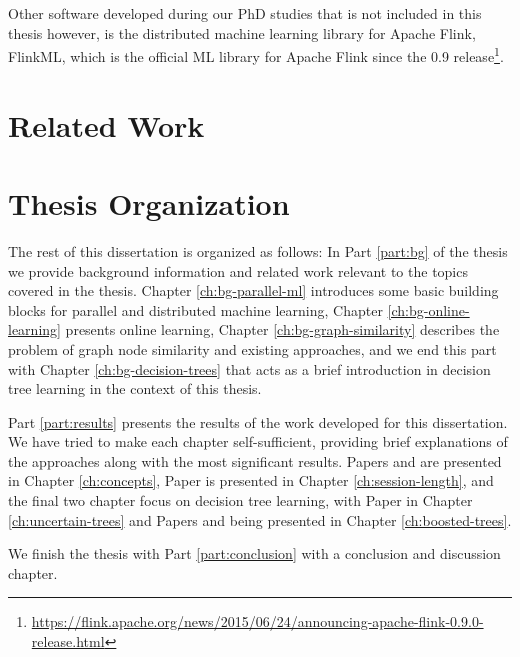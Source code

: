 Other software developed during our PhD studies that is not included in this
thesis however, is the distributed machine learning library for
Apache Flink, FlinkML, which is the official ML library for Apache Flink
since the 0.9 release\footnote{\url{https://flink.apache.org/news/2015/06/24/announcing-apache-flink-0.9.0-release.html}}.

\section{Related Work}

\section{Thesis Organization}

The rest of this dissertation is organized as follows:
In Part \ref{part:bg} of the thesis we provide background information and
related work relevant to the topics covered in the thesis. Chapter
\ref{ch:bg-parallel-ml} introduces some basic building blocks
for parallel and distributed machine learning, Chapter \ref{ch:bg-online-learning}
presents online learning, Chapter \ref{ch:bg-graph-similarity} describes the problem
of graph node similarity and existing approaches, and we end this part
with Chapter \ref{ch:bg-decision-trees} that acts as a brief introduction
in decision tree learning in the context of this thesis.

Part \ref{part:results} presents the results of the work developed for this
dissertation. We have tried to make each chapter self-sufficient, providing
brief explanations of the approaches along with the most significant results.
Papers \conceptsicdmNum and \conceptskaisNum are presented in Chapter \ref{ch:concepts},
Paper \sessionlengthNum is presented in Chapter \ref{ch:session-length}, and the final
two chapter focus on decision tree learning, with Paper \uncertaintreesNum
in Chapter \ref{ch:uncertain-trees} and Papers \boostvhtNum and \blockgbtNum
being presented in Chapter \ref{ch:boosted-trees}.

We finish the thesis with Part \ref{part:conclusion} with a conclusion and discussion
chapter.
